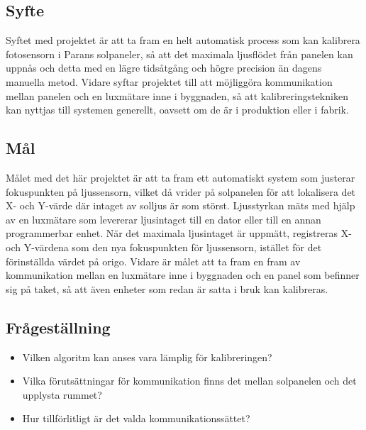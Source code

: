     \subsection{Syfte} %
    \label{sub:syfte}
          Syftet med projektet är att ta fram en helt automatisk process som kan kalibrera fotosensorn i Parans solpaneler, så att det maximala ljusflödet från panelen kan uppnås och detta med en lägre tidsåtgång och högre precision än dagens manuella metod. 
          Vidare syftar projektet till att möjliggöra kommunikation mellan panelen och en lux\-mätare inne i byggnaden, så att kalibreringstekniken kan nyttjas till systemen generellt, oavsett om de är i produktion eller i fabrik.

    \subsection{Mål} %
    \label{sub:mal}
        Målet med det här projektet är att ta fram ett automatiskt system som justerar fokuspunkten på ljussensorn, vilket då vrider på solpanelen för att lokalisera det X- och Y-värde där intaget av solljus är som störst. 
        Ljusstyrkan mäts med hjälp av en luxmätare som levererar ljusintaget till en dator eller till en annan programmerbar enhet. 
        När det maximala ljusintaget är uppmätt, registreras X- och Y-värdena som den nya fokuspunkten för ljussensorn, istället för det förinställda värdet på origo. 
        Vidare är målet att ta fram en fram av kommunikation mellan en luxmätare inne i byggnaden och en panel som befinner sig på taket, så att även enheter som redan är satta i bruk kan kalibreras. 


    \subsection{Frågeställning} %
    \label{sub:fragestallning}
        \begin{itemize}
            \item Vilken algoritm kan anses vara lämplig för kalibreringen?\\
            \item Vilka förutsättningar för kommunikation finns det mellan solpanelen och det upplysta rummet? \\
            \item Hur tillförlitligt är det valda kommunikationssättet? \\
            
        \end{itemize}

